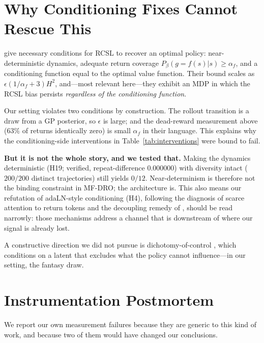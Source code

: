 \documentclass[11pt]{article}
\begin{document}
\section{Why Conditioning Fixes Cannot Rescue This}
\label{sec:related}

\citet{brandfonbrener2022rcsl} give necessary conditions for RCSL to recover an
optimal policy: near-deterministic dynamics, adequate return coverage
$P_\beta(g{=}f(s)|s)\ge\alpha_f$, and a conditioning function equal to the
optimal value function. Their bound scales as
$\epsilon(1/\alpha_f + 3)H^2$, and---most relevant here---they exhibit an MDP in
which the RCSL bias persists \emph{regardless of the conditioning function}.

Our setting violates two conditions by construction. The rollout transition is a
draw from a GP posterior, so $\epsilon$ is large; and the dead-reward
measurement above ($63\%$ of returns identically zero) is small $\alpha_f$ in
their language. This explains why the conditioning-side interventions in
Table~\ref{tab:interventions} were bound to fail.

\textbf{But it is not the whole story, and we tested that.} Making the dynamics
deterministic (H19; verified, repeat-difference $0.000000$) with diversity
intact ($200/200$ distinct trajectories) still yields $0/12$. Near-determinism
is therefore not the binding constraint in MF-DRO; the architecture is. This
also means our refutation of adaLN-style conditioning (H4), following the
diagnosis of scarce attention to return tokens \citep{tanaka2024radt} and the
decoupling remedy of \citet{wang2026ddt}, should be read narrowly: those
mechanisms address a channel that is downstream of where our signal is already
lost.

A constructive direction we did not pursue is dichotomy-of-control
\citep{yang2022doc}, which conditions on a latent that excludes what the policy
cannot influence---in our setting, the fantasy draw.

\section{Instrumentation Postmortem}
\label{sec:postmortem}

We report our own measurement failures because they are generic to this kind of
work, and because two of them would have changed our conclusions.
\end{document}
